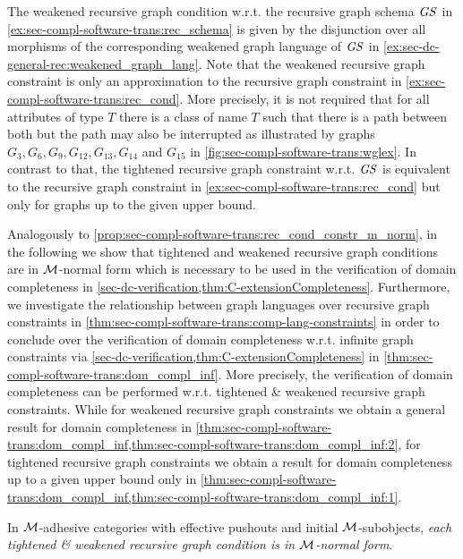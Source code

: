 \begin{example}
The weakened recursive graph condition w.r.t. the recursive graph schema $\mathit{GS}$ in \cref{ex:sec-compl-software-trans:rec_schema} is given by the disjunction over all morphisms of the corresponding weakened graph language of $\mathit{GS}$ in \cref{ex:sec-dc-general-rec:weakened_graph_lang}.
Note that the weakened recursive graph constraint is only an approximation to the recursive graph constraint in \cref{ex:sec-compl-software-trans:rec_cond}.
More precisely, it is not required that for all attributes of type $T$ there is a class of name $T$ such that there is a path between both but the path may also be interrupted as illustrated by graphs $G_3,G_6,G_9,G_{12},G_{13},G_{14}$ and $G_{15}$ in \cref{fig:sec-compl-software-trans:wglex}.
In contrast to that, the tightened recursive graph constraint w.r.t. $\mathit{GS}$ is equivalent to the recursive graph constraint in \cref{ex:sec-compl-software-trans:rec_cond} but only for graphs up to the given upper bound.
\envEndMarker
\end{example}

Analogously to \cref{prop:sec-compl-software-trans:rec_cond_constr_m_norm}, in the following we show that tightened and weakened recursive graph conditions are in ${\cal M}$-normal form which is necessary to be used in the verification of domain completeness in \cref{sec-dc-verification,thm:C-extensionCompleteness}.
Furthermore, we investigate the relationship between graph languages over recursive graph constraints in \cref{thm:sec-compl-software-trans:comp-lang-constraints} in order to conclude over the verification of domain completeness w.r.t. infinite graph constraints via \cref{sec-dc-verification,thm:C-extensionCompleteness} in \cref{thm:sec-compl-software-trans:dom_compl_inf}.
More precisely, the verification of domain completeness can be performed w.r.t. tightened \& weakened recursive graph constraints.
While for weakened recursive graph constraints we obtain a general result for domain completeness in \cref{thm:sec-compl-software-trans:dom_compl_inf,thm:sec-compl-software-trans:dom_compl_inf:2}, for tightened recursive graph constraints we obtain a result for domain completeness up to a given upper bound only in \cref{thm:sec-compl-software-trans:dom_compl_inf,thm:sec-compl-software-trans:dom_compl_inf:1}.

\begin{theorem}
\label{prop:sec-compl-software-trans:tight_weak_rec_cond_constr_m_norm}
In ${\cal M}$-adhesive categories with effective pushouts and initial ${\cal M}$-subobjects, \emph{each tightened \& weakened recursive graph condition is in ${\cal M}$-normal form}.
\envEndMarker
\end{theorem}

